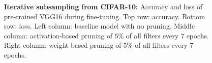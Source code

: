 \documentclass{article}
\begin{document}
\begin{figure}[!t]
{	}
	\caption{\textbf{Iterative subsampling from CIFAR-10:} Accuracy and loss of pre-trained VGG16 during fine-tuning. Top row: accuracy. Bottom row: loss. Left column: baseline model with no pruning. Middle column: activation-based pruning of $5$\% of all filters every $7$ epochs. Right column: weight-based pruning of $5$\% of all filters every $7$ epochs.}
	\label{pruneFiltersIntersectionSubsample}
\end{figure}
\end{document}
